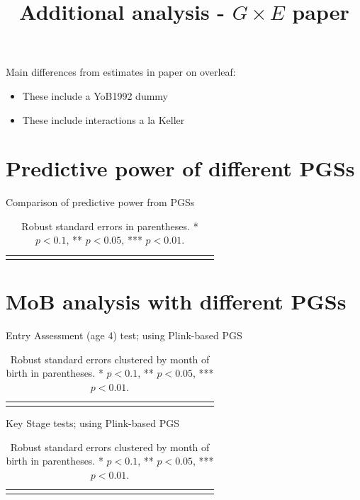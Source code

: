 \documentclass{article}
\title{Additional analysis - $G \times E$ paper}
\begin{document}
\maketitle


\bigskip 
Main differences from estimates in paper on overleaf:
\begin{itemize}
\item These include a YoB1992 dummy 
\item These include interactions a la Keller
\end{itemize}




\section{Predictive power of different PGSs}

\begin{table}[H]
\caption{Comparison of predictive power from PGSs}
\centering
{\footnotesize
\begin{tabular}{lcccccccccccccccccccc}
\toprule

\bottomrule
\addlinespace[.75ex]
\end{tabular}
}
\caption*{\noindent\scriptsize Robust standard errors in parentheses. * $p < 0.1$, ** $p < 0.05$, *** $p < 0.01$.}
\end{table}

\clearpage


\section{MoB analysis with different PGSs}
\begin{table}[H]
\caption{Entry Assessment (age 4) test; using Plink-based PGS}
\centering
{\scriptsize
\begin{tabular}{lcccccccccccccccccccc}
\toprule

\bottomrule
\addlinespace[.75ex]
\end{tabular}
}
\caption*{\noindent\scriptsize Robust standard errors clustered by month of birth in parentheses. * $p < 0.1$, ** $p < 0.05$, *** $p < 0.01$.}
\end{table}

\begin{table}[H]
\caption{Key Stage tests; using Plink-based PGS}
\centering
{\scriptsize
\begin{tabular}{lcccccccccccccccccccc}
\toprule

\bottomrule
\addlinespace[.75ex]
\end{tabular}
}
\caption*{\noindent\scriptsize Robust standard errors clustered by month of birth in parentheses. * $p < 0.1$, ** $p < 0.05$, *** $p < 0.01$.}
\end{table}
\end{document}
